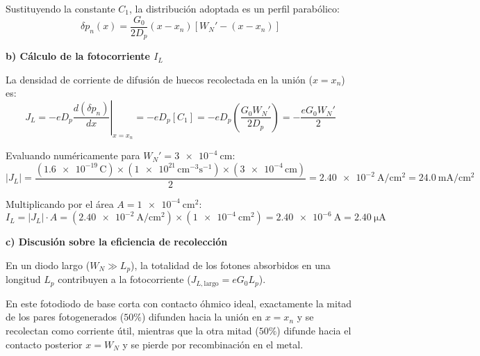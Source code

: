 \begin{problema}
Sustituyendo la constante $C_1$, la distribución adoptada es un perfil parabólico:
\[
\delta p_n(x) = \frac{G_0}{2 D_p} (x - x_n) \left[ W_N' - (x - x_n) \right]
\]

\textbf{b) Cálculo de la fotocorriente $I_L$}

La densidad de corriente de difusión de huecos recolectada en la unión ($x = x_n$) es:
\[
J_L = -e D_p \left. \frac{d(\delta p_n)}{dx} \right|_{x=x_n} = -e D_p \left[ C_1 \right] = -e D_p \left( \frac{G_0 W_N'}{2 D_p} \right) = -\frac{e G_0 W_N'}{2}
\]

Evaluando numéricamente para $W_N' = \SI{3e-4}{\cm}$:
\[
|J_L| = \frac{(\num{1.6e-19}\,\text{C}) \times (\num{1e21}\,\text{cm}^{-3}\text{s}^{-1}) \times (\num{3e-4}\,\text{cm})}{2} = \SI{2.40e-2}{\A\per\cm^2} = \SI{24.0}{\mA\per\cm^2}
\]

Multiplicando por el área $A = \SI{1e-4}{\cm^2}$:
\[
I_L = |J_L| \cdot A = (\SI{2.40e-2}{\A\per\cm^2}) \times (\SI{1e-4}{\cm^2}) = \SI{2.40e-6}{\A} = \SI{2.40}{\micro\A}
\]

\textbf{c) Discusión sobre la eficiencia de recolección}

En un diodo largo ($W_N \gg L_p$), la totalidad de los fotones absorbidos en una longitud $L_p$ contribuyen a la fotocorriente ($J_{L,\text{largo}} = e G_0 L_p$). 

En este fotodiodo de base corta con contacto óhmico ideal, exactamente la mitad de los pares fotogenerados ($50\%$) difunden hacia la unión en $x = x_n$ y se recolectan como corriente útil, mientras que la otra mitad ($50\%$) difunde hacia el contacto posterior $x = W_N$ y se pierde por recombinación en el metal.
\end{problema}

